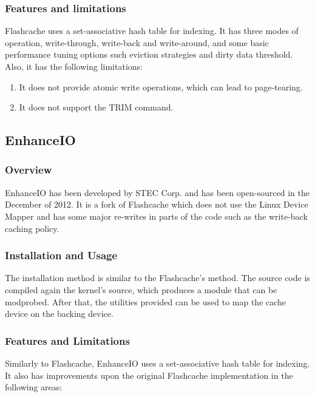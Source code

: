 \subsubsection{Features and limitations}

Flashcache uses a set-associative hash table for indexing. It has three modes 
of operation, write-through, write-back and write-around, and some basic 
performance tuning options such eviction strategies and dirty data threshold.  
Also, it has the following limitations:

\begin{enumerate}
	\item It does not provide atomic write operations, which can lead to 
		page-tearing.
	\item It does not support the TRΙΜ command.
\end{enumerate}

\subsection{EnhanceIO}

\subsubsection{Overview}

EnhanceIO has been developed by STEC Corp. and has been open-sourced in the 
December of 2012. It is a fork of Flashcache which does not use the Linux 
Device Mapper and has some major re-writes in parts of the code such as the 
write-back caching policy.

\subsubsection{Installation and Usage}

The installation method is similar to the Flashcache's method. The source code 
is compiled again the kernel's source, which produces a module that can be 
modprobed. After that, the utilities provided can be used to map the cache 
device on the backing device.

\subsubsection{Features and Limitations}

Similarly to Flashcache, EnhanceIO uses a set-associative hash table for 
indexing. It also has improvements upon the original Flashcache implementation 
in the following areas:

